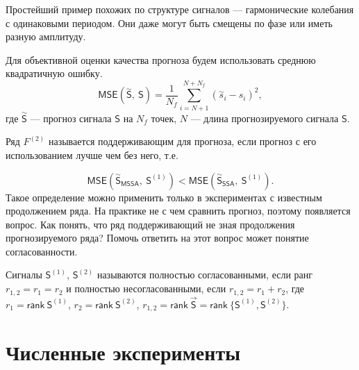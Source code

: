 \documentclass[specialist, substylefile = spbureport.rtx,
    subf,href,colorlinks=true, 12pt]{disser}
\newtheorem*{example}{Пример}
\newcommand{\rank}{\mathsf{rank}\ }
\newcommand{\sfS}{\mathsf{S}}
\newcommand{\MS}{\vec{\sfS}}
\newcommand{\MSE}{\mathsf{MSE}}
\newcommand{\SSA}{\mathsf{SSA}}
\newcommand{\MSSA}{\mathsf{MSSA}}
\begin{document}
        Простейший пример похожих по структуре сигналов --- гармонические колебания с одинаковыми периодом. Они даже могут быть смещены по фазе или иметь разную амплитуду.

        Для объективной оценки качества прогноза будем использовать среднюю квадратичную ошибку.
        $$\mathsf{MSE(\overset{\sim}{S},\ S)} = \frac{1}{N_{f}} \sum_{i = N+1}^{N + N_{f}} (\overset{\sim}{s}_i - s_i)^2,$$
        где $\overset{\sim}{\sfS}$ --- прогноз сигнала $\sfS$ на $N_{f}$ точек, $N$ --- длина прогнозируемого сигнала $\sfS$.
    

        Ряд $F^{(2)}$ называется поддерживающим для прогноза, если прогноз с его использованием лучше чем без него, т.е.
    
        $$\MSE(\overset{\sim}{\sfS}_{\MSSA},\ \sfS^{(1)}) < \MSE(\overset{\sim}{\sfS}_{\SSA},\ \sfS^{(1)}).$$
        Такое определение можно применить только в экспериментах с известным продолжением ряда. На практике не с чем сравнить прогноз, поэтому появляется вопрос. Как понять, что ряд поддерживающий не зная продолжения прогнозируемого ряда? Помочь ответить на этот вопрос может понятие согласованности.

        Сигналы $\sfS^{(1)}$, $\sfS^{(2)}$ называются полностью согласованными, если ранг $r_{1,2} = r_1 = r_2$ и полностью несогласованными, если $r_{1,2} = r_1 + r_2$, где $r_1 = \rank \sfS^{(1)}$, $r_2 = \rank \sfS^{(2)}$, $r_{1,2} = \rank \MS = \rank \{\sfS^{(1)}, \sfS^{(2)}\}.$



    \chapter{Численные эксперименты}
        
\end{document}
